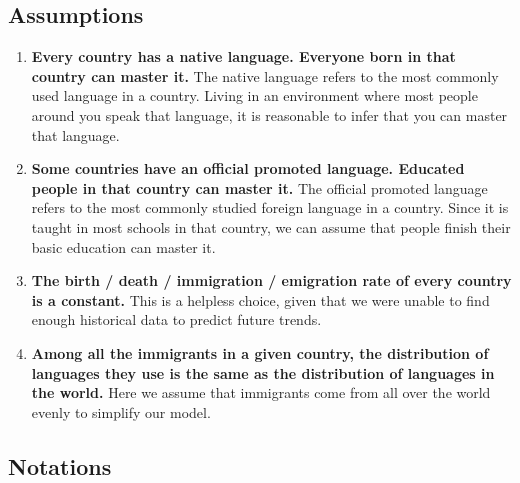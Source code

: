 \documentclass{mcmthesis}
\begin{document}
\subsection{Assumptions}\label{ssec:1}
\begin{enumerate}
    \item \textbf{Every country has a native language. Everyone born in that country can master it.} The native language refers to the most commonly used language in a country. Living in an environment where most people around you speak that language, it is reasonable to infer that you can master that language.
    \item \textbf{Some countries have an official promoted language. Educated people in that country can master it.} The official promoted language refers to the most commonly studied foreign language in a country. Since it is taught in most schools in that country, we can assume that people finish their basic education can master it.
    \item \textbf{The birth / death / immigration / emigration rate of every country is a constant.} This is a helpless choice, given that we were unable to find enough historical data to predict future trends.
    \item \textbf{Among all the immigrants in a given country, the distribution of languages they use is the same as the distribution of languages in the world.} Here we assume that immigrants come from all over the world evenly to simplify our model.

\end{enumerate}
\subsection{Notations}
\end{document}
